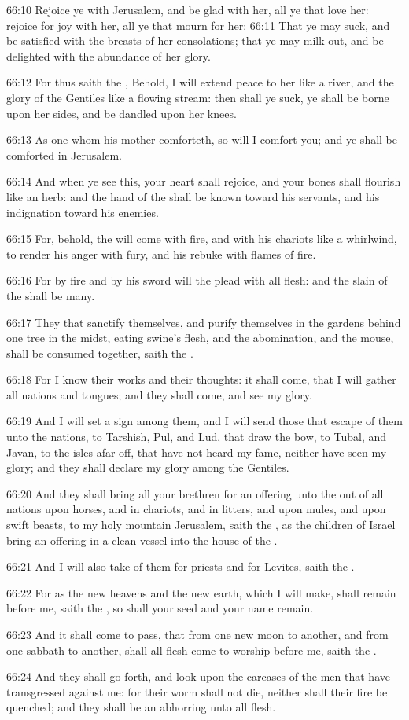 66:10 Rejoice ye with Jerusalem, and be glad with her, all ye that
love her: rejoice for joy with her, all ye that mourn for her: 66:11
That ye may suck, and be satisfied with the breasts of her
consolations; that ye may milk out, and be delighted with the
abundance of her glory.

66:12 For thus saith the \LORD, Behold, I will extend peace to her like
a river, and the glory of the Gentiles like a flowing stream: then
shall ye suck, ye shall be borne upon her sides, and be dandled upon
her knees.

66:13 As one whom his mother comforteth, so will I comfort you; and ye
shall be comforted in Jerusalem.

66:14 And when ye see this, your heart shall rejoice, and your bones
shall flourish like an herb: and the hand of the \LORD shall be known
toward his servants, and his indignation toward his enemies.

66:15 For, behold, the \LORD will come with fire, and with his chariots
like a whirlwind, to render his anger with fury, and his rebuke with
flames of fire.

66:16 For by fire and by his sword will the \LORD plead with all flesh:
and the slain of the \LORD shall be many.

66:17 They that sanctify themselves, and purify themselves in the
gardens behind one tree in the midst, eating swine's flesh, and the
abomination, and the mouse, shall be consumed together, saith the
\LORD.

66:18 For I know their works and their thoughts: it shall come, that I
will gather all nations and tongues; and they shall come, and see my
glory.

66:19 And I will set a sign among them, and I will send those that
escape of them unto the nations, to Tarshish, Pul, and Lud, that draw
the bow, to Tubal, and Javan, to the isles afar off, that have not
heard my fame, neither have seen my glory; and they shall declare my
glory among the Gentiles.

66:20 And they shall bring all your brethren for an offering unto the
\LORD out of all nations upon horses, and in chariots, and in litters,
and upon mules, and upon swift beasts, to my holy mountain Jerusalem,
saith the \LORD, as the children of Israel bring an offering in a clean
vessel into the house of the \LORD.

66:21 And I will also take of them for priests and for Levites, saith
the \LORD.

66:22 For as the new heavens and the new earth, which I will make,
shall remain before me, saith the \LORD, so shall your seed and your
name remain.

66:23 And it shall come to pass, that from one new moon to another,
and from one sabbath to another, shall all flesh come to worship
before me, saith the \LORD.

66:24 And they shall go forth, and look upon the carcases of the men
that have transgressed against me: for their worm shall not die,
neither shall their fire be quenched; and they shall be an abhorring
unto all flesh.

